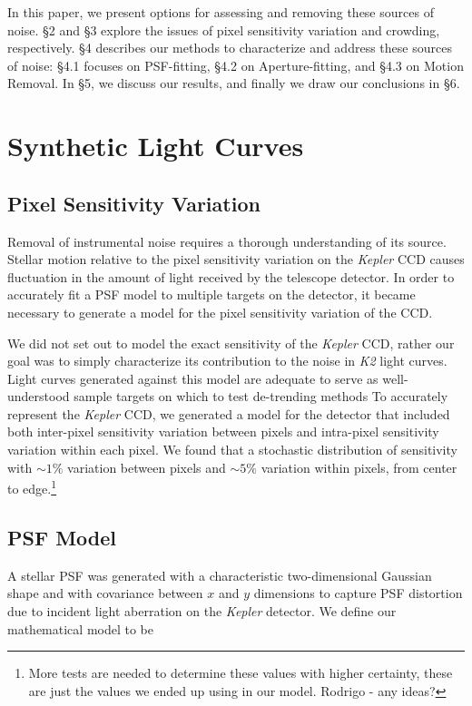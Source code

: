 \documentclass[12pt,preprint]{emulateapj}
\begin{document}
In this paper, we present options for assessing and removing these sources of noise. \S 2 and \S 3 explore the issues of pixel sensitivity variation and crowding, respectively. \S 4 describes our methods to characterize and address these sources of noise: \S 4.1 focuses on PSF-fitting, \S 4.2 on Aperture-fitting, and \S 4.3 on Motion Removal. In \S 5, we discuss our results, and finally we draw our conclusions in \S 6.

\section{Synthetic Light Curves}

\subsection{Pixel Sensitivity Variation}

Removal of instrumental noise requires a thorough understanding of its source. Stellar motion relative to the pixel sensitivity variation on the \textit{Kepler} CCD causes fluctuation in the amount of light received by the telescope detector. In order to accurately fit a PSF model to multiple targets on the detector, it became necessary to generate a model for the pixel sensitivity variation of the CCD.

We did not set out to model the exact sensitivity of the \textit{Kepler} CCD, rather our goal was to simply characterize its contribution to the noise in \textit{K2} light curves. Light curves generated against this model are adequate to serve as well-understood sample targets on which to test de-trending methods To accurately represent the \textit{Kepler} CCD, we generated a model for the detector that included both inter-pixel sensitivity variation between pixels and intra-pixel sensitivity variation within each pixel. We found that a stochastic distribution of sensitivity with ${\sim}1\%$ variation between pixels and ${\sim}5\%$ variation within pixels, from center to edge.\footnote{More tests are needed to determine these values with higher certainty, these are just the values we ended up using in our model. Rodrigo - any ideas?}

\subsection{PSF Model}

A stellar PSF was generated with a characteristic two-dimensional Gaussian shape and with covariance between $x$ and $y$ dimensions to capture PSF distortion due to incident light aberration on the \textit{Kepler} detector. We define our mathematical model to be
\end{document}

